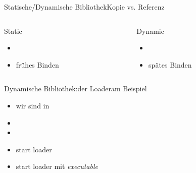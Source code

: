 \begin{frame}{Statische/Dynamische Bibliothek}{Kopie vs. Referenz}
 \begin{columns}
  \begin{column}{5cm}
   \begin{block}{Static}
   \begin{itemize}
    \item \hfill \vspace{-3mm}
    \item {\Large frühes} Binden
   \end{itemize}
   \end{block}
  \end{column}
  \begin{column}{5cm}
   \begin{block}{Dynamic}
    \begin{itemize}
    \item\hfill \vspace{-3mm}
    \item {\Large spätes} Binden
    \end{itemize}
   \end{block}
  \end{column}
 \end{columns}
 \begin{block}{}
 \end{block}
\end{frame}

\begin{frame}{Dynamische Bibliothek:der Loader}{am Beispiel }
 \begin{itemize}
  \item wir sind in 
  \item {} 
  \item {}
  \item start loader
  \item start loader mit {\em executable}
 \end{itemize}
\end{frame}

